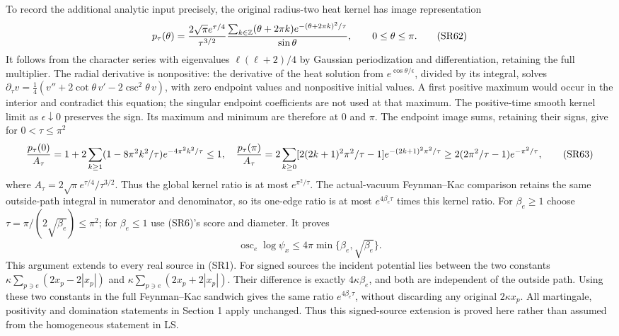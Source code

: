 \documentclass[11pt]{article}
\begin{document}
To record the additional analytic input precisely, the original radius-two heat kernel has image representation
\[
p_\tau(\theta)={2\sqrt\pi e^{\tau/4}\over\tau^{3/2}}
{\sum_{k\in\mathbb Z}(\theta+2\pi k)e^{-(\theta+2\pi k)^2/\tau}\over\sin\theta},
\qquad0\le\theta\le\pi.
\tag{SR62}
\]
It follows from the character series with eigenvalues \(\ell(\ell+2)/4\) by Gaussian periodization and differentiation, retaining the full multiplier. The radial derivative is nonpositive: the derivative of the heat solution from \(e^{\cos\theta/\epsilon}\), divided by its integral, solves
\(\partial_\tau v=\tfrac14(v''+2\cot\theta\,v'-2\csc^2\theta\,v)\),
with zero endpoint values and nonpositive initial values. A first positive maximum would occur in the interior and contradict this equation; the singular endpoint coefficients are not used at that maximum. The positive-time smooth kernel limit as \(\epsilon\downarrow0\) preserves the sign. Its maximum and minimum are therefore at 0 and \(\pi\). The endpoint image sums, retaining their signs, give for \(0<\tau\le\pi^2\)
\[
{p_\tau(0)\over A_\tau}
=1+2\sum_{k\ge1}(1-8\pi^2k^2/\tau)e^{-4\pi^2k^2/\tau}\le1,
\quad
{p_\tau(\pi)\over A_\tau}
=2\sum_{k\ge0}[2(2k+1)^2\pi^2/\tau-1]e^{-(2k+1)^2\pi^2/\tau}
\ge2(2\pi^2/\tau-1)e^{-\pi^2/\tau},
\tag{SR63}
\]
where \(A_\tau=2\sqrt\pi e^{\tau/4}/\tau^{3/2}\). Thus the global kernel ratio is at most \(e^{\pi^2/\tau}\). The actual-vacuum Feynman–Kac comparison retains the same outside-path integral in numerator and denominator, so its one-edge ratio is at most \(e^{4\beta_e\tau}\) times this kernel ratio. For \(\beta_e\ge1\) choose \(\tau=\pi/(2\sqrt{\beta_e})\le\pi^2\); for \(\beta_e\le1\) use (SR6)'s score and diameter. It proves
\[
\operatorname{osc}_e\log\psi_x\le4\pi\min\{\beta_e,\sqrt{\beta_e}\}.
\tag{SR64}
\]
This argument extends to every real source in (SR1). For signed sources the incident potential lies between the two constants
\(\kappa\sum_{p\ni e}(2x_p-2|x_p|)\) and
\(\kappa\sum_{p\ni e}(2x_p+2|x_p|)\).
Their difference is exactly \(4\kappa\beta_e\), and both are independent of the outside path. Using these two constants in the full Feynman–Kac sandwich gives the same ratio \(e^{4\beta_e\tau}\), without discarding any original \(2\kappa x_p\). All martingale, positivity and domination statements in Section 1 apply unchanged. Thus this signed-source extension is proved here rather than assumed from the homogeneous statement in LS.
\end{document}
